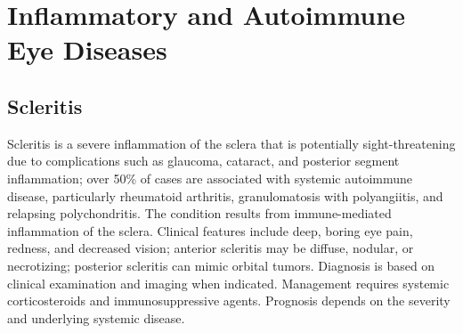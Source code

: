 \section{Inflammatory and Autoimmune Eye Diseases}








\label{sec:Inflammatory and Autoimmune Eye Diseases}

\subsection{Scleritis}
\label{sec:Scleritis}
Scleritis is a severe inflammation of the sclera that is potentially sight-threatening due to complications such as glaucoma, cataract, and posterior segment inflammation; over 50\% of cases are associated with systemic autoimmune disease, particularly rheumatoid arthritis, granulomatosis with polyangiitis, and relapsing polychondritis. The condition results from immune-mediated inflammation of the sclera. Clinical features include deep, boring eye pain, redness, and decreased vision; anterior scleritis may be diffuse, nodular, or necrotizing; posterior scleritis can mimic orbital tumors. Diagnosis is based on clinical examination and imaging when indicated. Management requires systemic corticosteroids and immunosuppressive agents. Prognosis depends on the severity and underlying systemic disease.

